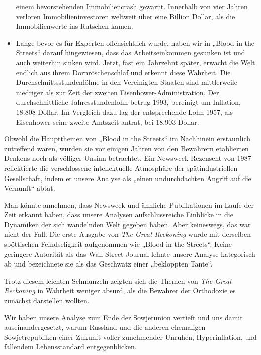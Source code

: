 \documentclass[
  a5paper,
  smalldemyvopaper,10pt,twoside,onecolumn,openright,extrafontsizes,hidelinks]{memoir}
\begin{document}
\begin{itemize}
  einem bevorstehenden Immobiliencrash gewarnt. Innerhalb von vier
  Jahren verloren Immobilieninvestoren weltweit über eine Billion
  Dollar, als die Immobilienwerte ins Rutschen kamen.
\item
  Lange bevor es für Experten offensichtlich wurde, haben wir in „Blood
  in the Streets`` darauf hingewiesen, dass das Arbeitseinkommen
  gesunken ist und auch weiterhin sinken wird. Jetzt, fast ein Jahrzehnt
  später, erwacht die Welt endlich aus ihrem Dornröschenschlaf und
  erkennt diese Wahrheit. Die Durchschnittsstundenlöhne in den
  Vereinigten Staaten sind mittlerweile niedriger als zur Zeit der
  zweiten Eisenhower-Administration. Der durchschnittliche
  Jahresstundenlohn betrug 1993, bereinigt um Inflation, 18.808 Dollar.
  Im Vergleich dazu lag der entsprechende Lohn 1957, als Eisenhower
  seine zweite Amtszeit antrat, bei 18.903 Dollar.
\end{itemize}

Obwohl die Hauptthemen von „Blood in the Streets`` im Nachhinein
erstaunlich zutreffend waren, wurden sie vor einigen Jahren von den
Bewahrern etablierten Denkens noch als völliger Unsinn betrachtet. Ein
Newsweek-Rezensent von 1987 reflektierte die verschlossene
intellektuelle Atmosphäre der spätindustriellen Gesellschaft, indem er
unsere Analyse als „einen undurchdachten Angriff auf die Vernunft``
abtat.

Man könnte annehmen, dass Newsweek und ähnliche Publikationen im Laufe
der Zeit erkannt haben, dass unsere Analysen aufschlussreiche Einblicke
in die Dynamiken der sich wandelnden Welt gegeben haben. Aber
keineswegs, das war nicht der Fall. Die erste Ausgabe von \emph{The
Great Reckoning} wurde mit derselben spöttischen Feindseligkeit
aufgenommen wie „Blood in the Streets``. Keine geringere Autorität als
das Wall Street Journal lehnte unsere Analyse kategorisch ab und
bezeichnete sie als das Geschwätz einer „bekloppten Tante``.

Trotz diesem leichten Schmunzeln zeigten sich die Themen von \emph{The
Great Reckoning} in Wahrheit weniger absurd, als die Bewahrer der
Orthodoxie es zunächst darstellen wollten.

Wir haben unsere Analyse zum Ende der Sowjetunion vertieft und uns damit
auseinandergesetzt, warum Russland und die anderen ehemaligen
Sowjetrepubliken einer Zukunft voller zunehmender Unruhen,
Hyperinflation, und fallendem Lebensstandard entgegenblicken.
\end{document}
